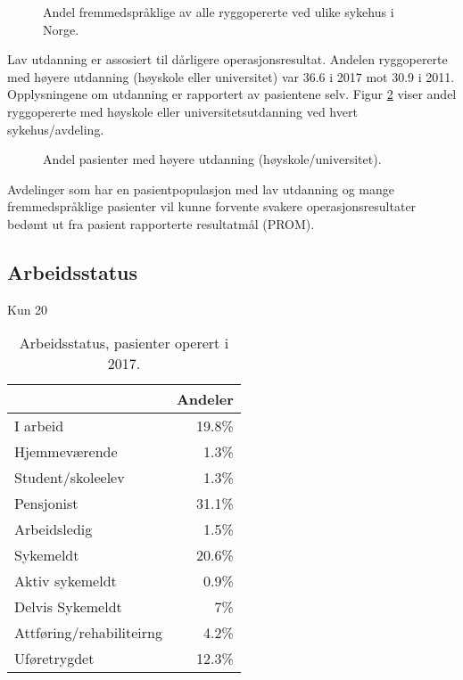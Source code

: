 \documentclass [norsk,a4paper,twoside]{article}\usepackage[]{graphicx}\usepackage[]{color}
\begin{document}
\begin{figure}[ht]
\caption{\label{fig:Morsmal} Andel fremmedspråklige av alle ryggopererte ved ulike sykehus i
Norge.}
\end{figure}




Lav utdanning er assosiert til dårligere operasjonsresultat. Andelen ryggopererte med høyere utdanning (høyskole eller universitet) var 36.6 i 2017 mot  30.9 i 2011. 
Opplysningene om utdanning er rapportert av pasientene selv. 
Figur \ref{fig:HoyUtdAvd} viser andel ryggopererte 
med høyskole eller universitetsutdanning ved hvert sykehus/avdeling.


\begin{figure}[ht]
\caption{\label{fig:HoyUtdAvd} Andel pasienter med høyere utdanning (høyskole/universitet).}
\end{figure}


\clearpage
Avdelinger som har en pasientpopulasjon med lav utdanning og mange fremmedspråklige pasienter vil kunne forvente svakere operasjonsresultater bedømt ut fra pasient rapporterte resultatmål (PROM).
\subsection{Arbeidsstatus}
Kun  20%

\begin{table}[ht]
\centering
\begin{tabular}{lr}
  \hline
 & Andeler \\ 
  \hline
I arbeid & 19.8\% \\ 
  Hjemmeværende & 1.3\% \\ 
  Student/skoleelev & 1.3\% \\ 
  Pensjonist & 31.1\% \\ 
  Arbeidsledig & 1.5\% \\ 
  Sykemeldt & 20.6\% \\ 
  Aktiv sykemeldt & 0.9\% \\ 
  Delvis Sykemeldt & 7\% \\ 
  Attføring/rehabiliteirng & 4.2\% \\ 
  Uføretrygdet & 12.3\% \\ 
   \hline
\end{tabular}
\caption{Arbeidsstatus, pasienter operert i 2017.} 
\label{tab:Arb}
\end{table}
\end{document}
